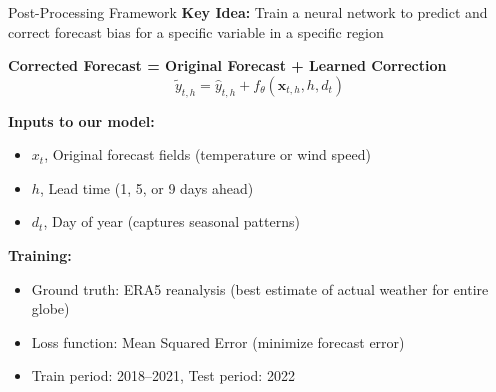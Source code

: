 \documentclass[aspectratio=169, xcolor=dvipsnames]{beamer}
\begin{document}
\begin{frame}{Post-Processing Framework}
    \textbf{Key Idea:} Train a neural network to predict and correct forecast bias for a specific variable in a specific region

    \vspace{0.3cm}
    \textbf{Corrected Forecast = Original Forecast + Learned Correction}
    \[
    \tilde{y}_{t,h} = \hat{y}_{t,h} + f_\theta(\mathbf{x}_{t,h}, h, d_t)
    \]

    \vspace{0.3cm}
    \textbf{Inputs to our model:}
    \begin{itemize}
        \item $x_t$, Original forecast fields (temperature or wind speed)
        \item $h$, Lead time (1, 5, or 9 days ahead)
        \item $d_t$, Day of year (captures seasonal patterns)
    \end{itemize}

    \vspace{0.3cm}
    \textbf{Training:}
    \begin{itemize}
        \item Ground truth: ERA5 reanalysis (best estimate of actual weather for entire globe)
        \item Loss function: Mean Squared Error (minimize forecast error)
        \item Train period: 2018--2021, Test period: 2022
    \end{itemize}
\end{frame}
\end{document}
